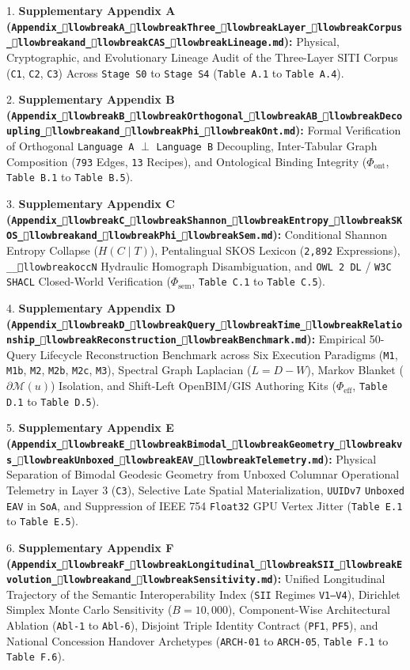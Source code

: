 \documentclass[10pt,a4paper]{article}
\begin{document}
1. \textbf{Supplementary Appendix A (\texttt{Appendix\_llowbreak{}A\_llowbreak{}Three\_llowbreak{}Layer\_llowbreak{}Corpus\_llowbreak{}and\_llowbreak{}CAS\_llowbreak{}Lineage.md}):} Physical, Cryptographic, and Evolutionary Lineage Audit of the Three-Layer SITI Corpus (\texttt{C1}, \texttt{C2}, \texttt{C3}) Across \texttt{Stage S0} to \texttt{Stage S4} (\texttt{Table A.1} to \texttt{Table A.4}).\par
2. \textbf{Supplementary Appendix B (\texttt{Appendix\_llowbreak{}B\_llowbreak{}Orthogonal\_llowbreak{}AB\_llowbreak{}Decoupling\_llowbreak{}and\_llowbreak{}Phi\_llowbreak{}Ont.md}):} Formal Verification of Orthogonal \texttt{Language A} $\perp$ \texttt{Language B} Decoupling, Inter-Tabular Graph Composition (\texttt{793} Edges, \texttt{13} Recipes), and Ontological Binding Integrity ($\Phi_{\text{ont}}$, \texttt{Table B.1} to \texttt{Table B.5}).\par
3. \textbf{Supplementary Appendix C (\texttt{Appendix\_llowbreak{}C\_llowbreak{}Shannon\_llowbreak{}Entropy\_llowbreak{}SKOS\_llowbreak{}and\_llowbreak{}Phi\_llowbreak{}Sem.md}):} Conditional Shannon Entropy Collapse ($H(C \mid T)$), Pentalingual SKOS Lexicon (\texttt{2,892} Expressions), \texttt{\_\_llowbreak{}occN} Hydraulic Homograph Disambiguation, and \texttt{OWL 2 DL} / \texttt{W3C SHACL} Closed-World Verification ($\Phi_{\text{sem}}$, \texttt{Table C.1} to \texttt{Table C.5}).\par
4. \textbf{Supplementary Appendix D (\texttt{Appendix\_llowbreak{}D\_llowbreak{}Query\_llowbreak{}Time\_llowbreak{}Relationship\_llowbreak{}Reconstruction\_llowbreak{}Benchmark.md}):} Empirical 50-Query Lifecycle Reconstruction Benchmark across Six Execution Paradigms (\texttt{M1}, \texttt{M1b}, \texttt{M2}, \texttt{M2b}, \texttt{M2c}, \texttt{M3}), Spectral Graph Laplacian ($L = D - W$), Markov Blanket ($\partial\mathcal{M}(u)$) Isolation, and Shift-Left OpenBIM/GIS Authoring Kits ($\Phi_{\text{eff}}$, \texttt{Table D.1} to \texttt{Table D.5}).\par
5. \textbf{Supplementary Appendix E (\texttt{Appendix\_llowbreak{}E\_llowbreak{}Bimodal\_llowbreak{}Geometry\_llowbreak{}vs\_llowbreak{}Unboxed\_llowbreak{}EAV\_llowbreak{}Telemetry.md}):} Physical Separation of Bimodal Geodesic Geometry from Unboxed Columnar Operational Telemetry in Layer 3 (\texttt{C3}), Selective Late Spatial Materialization, \texttt{UUIDv7} \texttt{Unboxed EAV} in \texttt{SoA}, and Suppression of IEEE 754 \texttt{Float32} GPU Vertex Jitter (\texttt{Table E.1} to \texttt{Table E.5}).\par
6. \textbf{Supplementary Appendix F (\texttt{Appendix\_llowbreak{}F\_llowbreak{}Longitudinal\_llowbreak{}SII\_llowbreak{}Evolution\_llowbreak{}and\_llowbreak{}Sensitivity.md}):} Unified Longitudinal Trajectory of the Semantic Interoperability Index (\texttt{SII} Regimes \texttt{V1--V4}), Dirichlet Simplex Monte Carlo Sensitivity ($B = 10,000$), Component-Wise Architectural Ablation (\texttt{Abl-1} to \texttt{Abl-6}), Disjoint Triple Identity Contract (\texttt{PF1}, \texttt{PF5}), and National Concession Handover Archetypes (\texttt{ARCH-01} to \texttt{ARCH-05}, \texttt{Table F.1} to \texttt{Table F.6}).\par
\end{document}
